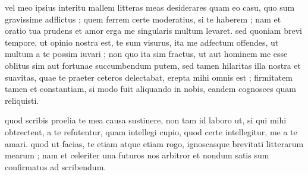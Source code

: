 


 vel meo ipsius interitu mallem litteras meas desiderares quam eo casu, quo sum gravissime adflictus ; quem ferrem certe moderatius, si te haberem ; nam et oratio tua prudens et amor erga me singularis multum levaret. sed quoniam brevi tempore, ut opinio nostra est, te sum visurus, ita me adfectum offendes, ut multum a te possim iuvari ; non quo ita sim fractus, ut aut hominem me esse oblitus sim aut fortunae succumbendum putem, sed tamen hilaritas illa nostra et suavitas, quae te praeter ceteros delectabat, erepta mihi omnis est ; firmitatem tamen et constantiam, si modo fuit aliquando in nobis, eandem cognosces quam reliquisti.

 quod scribis proelia te mea causa sustinere, non tam id laboro ut, si qui mihi obtrectent, a te refutentur, quam intellegi cupio, quod certe intellegitur, me a te amari. quod ut facias, te etiam atque etiam rogo, ignoscasque brevitati litterarum mearum ; nam et celeriter una futuros nos arbitror et nondum satis sum confirmatus ad scribendum.
